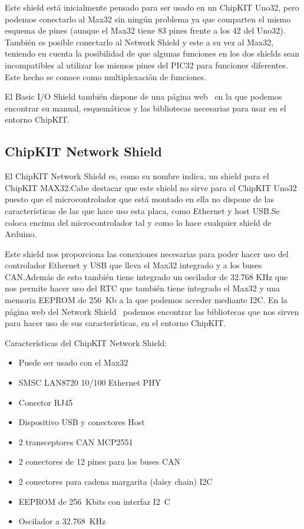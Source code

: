 Este shield está inicialmente pensado para ser usado en un ChipKIT Uno32, pero podemos conectarlo al Max32 sin ningún problema ya que comparten el mismo esquema de pines (aunque el Max32 tiene 83 pines frente a los 42 del Uno32). También es posible conectarlo al Network Shield y este a su vez al Max32, teniendo en cuenta la posibilidad de que algunas funciones en los dos shields sean incompatibles al utilizar los mismos pines del PIC32 para funciones diferentes. Este hecho se conoce como multiplexación de funciones.

El Basic I/O Shield también dispone de una página web~\cite{website:io_shield} en la que podemos encontrar su manual, esquemáticos y las bibliotecas necesarias para usar en el entorno ChipKIT.\@
\subsection{ChipKIT Network Shield}

El ChipKIT Network Shield es, como su nombre indica, un shield para el ChipKIT MAX32.\@ Cabe destacar que este shield no sirve para el ChipKIT Uno32 puesto que el microcontrolador que está montado en ella no dispone de las características de las que hace uso esta placa, como Ethernet y host USB.\@ Se coloca encima del microcontrolador tal y como lo hace cualquier shield de Arduino.


Este shield nos proporciona las conexiones necesarias para poder hacer uso del controlador Ethernet y USB que lleva el Max32 integrado y a los buses CAN.\@ Además de esto también tiene integrado un oscilador de 32.768 KHz que nos permite hacer uso del RTC que también tiene integrado el Max32 y una memoria EEPROM de 256~Kb a la que podemos acceder mediante I2C. En la página web del Network Shield~\cite{website:network_shield} podemos encontrar las bibliotecas que nos sirven para hacer uso de sus características, en el entorno ChipKIT.\@

Características del ChipKIT Network Shield:
\begin{itemize}
	\item Puede ser usado con el Max32
	\item SMSC LAN8720 10/100 Ethernet PHY
	\item Conector RJ45
	\item Dispositivo USB y conectores Host
	\item 2 transceptores CAN MCP2551
	\item 2 conectores de 12 pines para los buses CAN
	\item 2 conectores para cadena margarita (daisy chain) I2C
	\item EEPROM de 256~Kbits con interfaz I2~C
	\item Oscilador a 32.768~KHz
\end{itemize}


